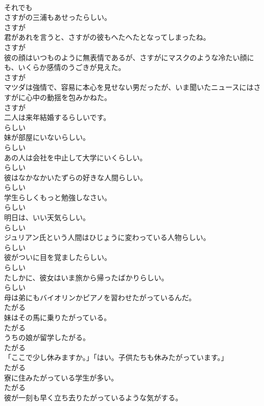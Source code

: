 \documentclass[8pt]{extreport}
\begin{document}
\begin{CJK}{UTF8}{min}
\\	それでも
\\	さすがの三浦もあせったらしい。	
\\	さすが
\\	君があれを言うと、さすがの彼もへたへたとなってしまったね。	
\\	さすが
\\	彼の顔はいつものように無表情であるが、さすがにマスクのような冷たい顔にも、いくらか感情のうごきが見えた。	
\\	さすが
\\	マツダは強情で、容易に本心を見せない男だったが、いま聞いたニュースにはさすがに心中の動揺を包みかねた。	
\\	さすが
\\	二人は来年結婚するらしいです。	
\\	らしい
\\	妹が部屋にいないらしい。	
\\	らしい
\\	あの人は会社を中止して大学にいくらしい。	
\\	らしい
\\	彼はなかなかいたずらの好きな人間らしい。	
\\	らしい
\\	学生らしくもっと勉強しなさい。	
\\	らしい
\\	明日は、いい天気らしい。	
\\	らしい
\\	ジュリアン氏という人間はひじょうに変わっている人物らしい。	
\\	らしい
\\	彼がついに目を覚ましたらしい。	
\\	らしい
\\	たしかに、彼女はいま旅から帰ったばかりらしい。	
\\	らしい
\\	母は弟にもバイオリンかピアノを習わせたがっているんだ。	
\\	たがる
\\	妹はその馬に乗りたがっている。	
\\	たがる
\\	うちの娘が留学したがる。	
\\	たがる
\\	「ここで少し休みますか。」「はい。子供たちも休みたがっています。」	
\\	たがる
\\	寮に住みたがっている学生が多い。	
\\	たがる
\\	彼が一刻も早く立ち去りたがっているような気がする。	

\end{CJK}
\end{document}
